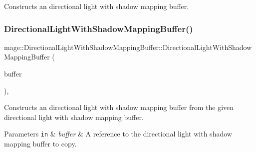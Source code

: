 Constructs an directional light with shadow mapping buffer. \hypertarget{structmage_1_1_directional_light_with_shadow_mapping_buffer_a8681c4ef469907846c12896d0e00eaaf}{}\label{structmage_1_1_directional_light_with_shadow_mapping_buffer_a8681c4ef469907846c12896d0e00eaaf} 
\subsubsection{\texorpdfstring{Directional\+Light\+With\+Shadow\+Mapping\+Buffer()}{DirectionalLightWithShadowMappingBuffer()}\hspace{0.1cm}{\footnotesize\ttfamily [2/3]}}
{\footnotesize\ttfamily mage\+::\+Directional\+Light\+With\+Shadow\+Mapping\+Buffer\+::\+Directional\+Light\+With\+Shadow\+Mapping\+Buffer (\begin{DoxyParamCaption}\item[{const \hyperlink{structmage_1_1_directional_light_with_shadow_mapping_buffer}{Directional\+Light\+With\+Shadow\+Mapping\+Buffer} \&}]{buffer }\end{DoxyParamCaption})\hspace{0.3cm}{\ttfamily [default]}, {\ttfamily [noexcept]}}

Constructs an directional light with shadow mapping buffer from the given directional light with shadow mapping buffer.


\begin{DoxyParams}[1]{Parameters}
\mbox{\tt in}  & {\em buffer} & A reference to the directional light with shadow mapping buffer to copy. \\
\hline
\end{DoxyParams}
\hypertarget{structmage_1_1_directional_light_with_shadow_mapping_buffer_a93570e94e1da3b02e0fc6aeeca3e2125}{}\label{structmage_1_1_directional_light_with_shadow_mapping_buffer_a93570e94e1da3b02e0fc6aeeca3e2125} 
